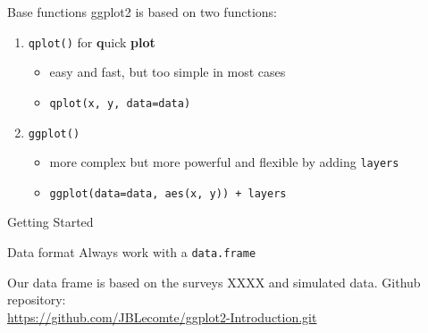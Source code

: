 \documentclass{beamer}\usepackage[]{graphicx}\usepackage[]{color}
\begin{document}
\begin{frame}{Base functions}
ggplot2 is based on two functions:
  \begin{enumerate}
		\item  \texttt{qplot()} for \textbf{q}uick \textbf{plot}
		\begin{itemize}
			\item easy and fast, but too simple in most cases
			\item \texttt{qplot(x, y, data=data)}
		\end{itemize}
    \vspace{0.5cm}
    \item \texttt{ggplot()}
      	\begin{itemize}
			\item more complex but more powerful and flexible by adding \texttt{layers}
			\item \texttt{ggplot(data=data, aes(x, y)) + layers}
		\end{itemize}
  \end{enumerate}
\end{frame}


\begin{frame}[fragile]{Getting Started}

  \begin{alertblock}{Data format}
    Always work with a \texttt{data.frame}
  \end{alertblock}
    Our data frame is based on the surveys XXXX and simulated data.
    Github repository:\\ \url{https://github.com/JBLecomte/ggplot2-Introduction.git}
\end{frame}
\end{document}
